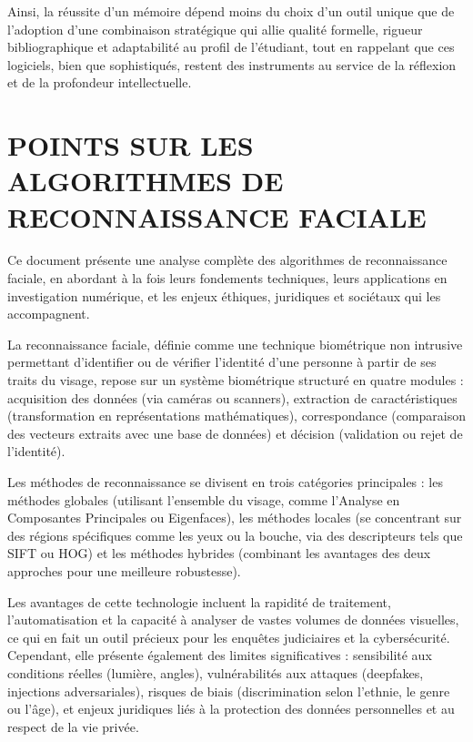\documentclass[12pt,a4paper]{article}
\begin{document}
Ainsi, la réussite d'un mémoire dépend moins du choix d'un outil unique que de l'adoption d'une combinaison stratégique qui allie qualité formelle, rigueur bibliographique et adaptabilité au profil de l'étudiant, tout en rappelant que ces logiciels, bien que sophistiqués, restent des instruments au service de la réflexion et de la profondeur intellectuelle.

\section{POINTS SUR LES ALGORITHMES DE RECONNAISSANCE FACIALE}

Ce document présente une analyse complète des algorithmes de reconnaissance faciale, en abordant à la fois leurs fondements techniques, leurs applications en investigation numérique, et les enjeux éthiques, juridiques et sociétaux qui les accompagnent. 

La reconnaissance faciale, définie comme une technique biométrique non intrusive permettant d'identifier ou de vérifier l'identité d'une personne à partir de ses traits du visage, repose sur un système biométrique structuré en quatre modules : acquisition des données (via caméras ou scanners), extraction de caractéristiques (transformation en représentations mathématiques), correspondance (comparaison des vecteurs extraits avec une base de données) et décision (validation ou rejet de l'identité). 

Les méthodes de reconnaissance se divisent en trois catégories principales : les méthodes globales (utilisant l'ensemble du visage, comme l'Analyse en Composantes Principales ou Eigenfaces), les méthodes locales (se concentrant sur des régions spécifiques comme les yeux ou la bouche, via des descripteurs tels que SIFT ou HOG) et les méthodes hybrides (combinant les avantages des deux approches pour une meilleure robustesse). 

Les avantages de cette technologie incluent la rapidité de traitement, l'automatisation et la capacité à analyser de vastes volumes de données visuelles, ce qui en fait un outil précieux pour les enquêtes judiciaires et la cybersécurité. Cependant, elle présente également des limites significatives : sensibilité aux conditions réelles (lumière, angles), vulnérabilités aux attaques (deepfakes, injections adversariales), risques de biais (discrimination selon l'ethnie, le genre ou l'âge), et enjeux juridiques liés à la protection des données personnelles et au respect de la vie privée. 
\end{document}
